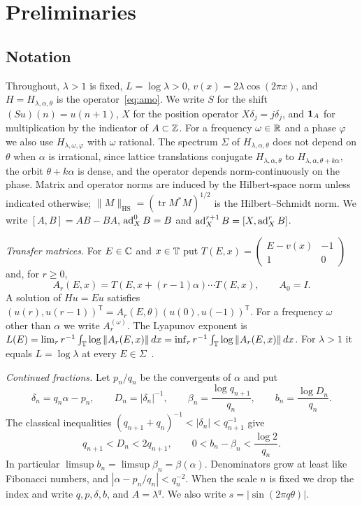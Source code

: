 \section{Preliminaries}\label{sec:prelim}

\subsection{Notation}

Throughout, $\lambda>1$ is fixed, $L=\log\lambda>0$, $v(x)=2\lambda\cos(2\pi x)$, and $H=H_{\lambda,\alpha,\theta}$ is the operator~\eqref{eq:amo}. We write $S$ for the shift $(Su)(n)=u(n+1)$, $X$ for the position operator $X\delta_j=j\delta_j$, and $\mathbf 1_A$ for multiplication by the indicator of $A\subset\mathbb Z$. For a frequency $\omega\in\mathbb R$ and a phase $\varphi$ we also use $H_{\lambda,\omega,\varphi}$ with $\omega$ rational. The spectrum $\Sigma$ of $H_{\lambda,\alpha,\theta}$ does not depend on $\theta$ when $\alpha$ is irrational, since lattice translations conjugate $H_{\lambda,\alpha,\theta}$ to $H_{\lambda,\alpha,\theta+k\alpha}$, the orbit $\theta+k\alpha$ is dense, and the operator depends norm-continuously on the phase. Matrix and operator norms are induced by the Hilbert-space norm unless indicated otherwise; $\|M\|_{\mathrm{HS}}=(\operatorname{tr}M^*M)^{1/2}$ is the Hilbert--Schmidt norm. We write $[A,B]=AB-BA$, $\operatorname{ad}_X^0B=B$ and $\operatorname{ad}_X^{r+1}B=[X,\operatorname{ad}_X^rB]$.

\emph{Transfer matrices.} For $E\in\mathbb C$ and $x\in\mathbb T$ put $T(E,x)=\begin{pmatrix}E-v(x)&-1\\1&0\end{pmatrix}$ and, for $r\ge0$,
\[
A_r(E,x)=T(E,x+(r-1)\alpha)\cdots T(E,x),\qquad A_0=I.
\]
A solution of $Hu=Eu$ satisfies $(u(r),u(r-1))^{\mathsf T}=A_r(E,\theta)(u(0),u(-1))^{\mathsf T}$. For a frequency $\omega$ other than $\alpha$ we write $A_r^{(\omega)}$. The Lyapunov exponent is $L(E)=\lim_r r^{-1}\int_\mathbb T\log\|A_r(E,x)\|\,dx=\inf_r r^{-1}\int_\mathbb T\log\|A_r(E,x)\|\,dx$. For $\lambda>1$ it equals $L=\log\lambda$ at every $E\in\Sigma$~\cite[Corollary~2]{BourgainJitomirskaya2002}.

\emph{Continued fractions.} Let $p_n/q_n$ be the convergents of $\alpha$ and put
\[
\delta_n=q_n\alpha-p_n,\qquad D_n=|\delta_n|^{-1},\qquad \beta_n=\frac{\log q_{n+1}}{q_n},\qquad b_n=\frac{\log D_n}{q_n}.
\]
The classical inequalities $(q_{n+1}+q_n)^{-1}<|\delta_n|<q_{n+1}^{-1}$ give
\begin{equation}\label{eq:bn}
q_{n+1}<D_n<2q_{n+1},\qquad 0<b_n-\beta_n<\frac{\log2}{q_n}.
\end{equation}
In particular $\limsup b_n=\limsup\beta_n=\beta(\alpha)$. Denominators grow at least like Fibonacci numbers, and $|\alpha-p_n/q_n|<q_n^{-2}$. When the scale $n$ is fixed we drop the index and write $q,p,\delta,b$, and $A=\lambda^q$. We also write $s=|\sin(2\pi q\theta)|$.

